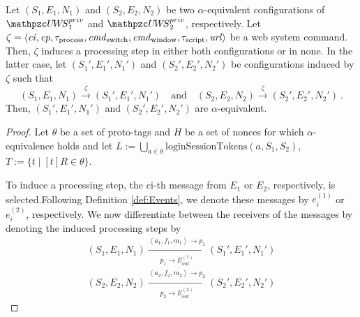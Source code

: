 \begin{theorem}
  \begin{lemma}\label{lemma:step-config-private}
    Let $(S_1,E_1,N_1)$ and $(S_2,E_2,N_2)$ be two 
    $\alpha$-equivalent configurations of 
    $\uppressoprivwebsystem_1$ and $\uppressoprivwebsystem_2$, 
    respectively. Let $\zeta = \langle\mathit{ci},\mathit{cp}, 
    \tau_\text{process}, \mathit{cmd}_\text{switch}, 
    \mathit{cmd}_\text{window},\tau_\text{script},\mathit{url}\rangle$
    be a web system command. Then, $\zeta$ induces a processing 
    step in either both configurations or in none. In the latter 
    case, let $(S_1',E_1',N_1')$ and $(S_2',E_2',N_2')$ be 
    configurations induced by $\zeta$ such that
    \[(S_1,E_1,N_1) \xrightarrow{\zeta} (S_1',E_1',N_1') \quad 
    \text{and} \quad (S_2,E_2,N_2) \xrightarrow{\zeta} 
    (S_2',E_2',N_2') \ .\]
    Then, $(S_1',E_1',N_1')$ and $(S_2',E_2',N_2')$ are
    $\alpha$-equivalent.  
  \end{lemma}
  \begin{proof}
    Let $\theta$ be a set of proto-tags and $H$ be a set of 
    nonces for which $\alpha$-equivalence holds and let 
    $L:=\bigcup_{a\in\theta}\text{loginSessionTokens}(a,S_1,S_2)$,
    $T:=\{t\mid [t]R\in \theta\}$.
    
    To induce a processing step, the ci-th message from $E_1$ or 
    $E_2$, respectively, is selected.Following Definition 
    \ref{def:Events}, we denote these messages by $e_i^{(1)}$ or 
    $e_i^{(2)}$, respectively. We now differentiate between the 
    receivers of the messages by denoting the induced processing 
    steps by
    \begin{equation}
      \begin{aligned}
        (S_1,E_1,N_1)\xrightarrow[p_1\rightarrow E_{out}^{(1)}]{\left \langle a_1,f_1,m_1\right \rangle\rightarrow p_1}(S_1\prime,E_1\prime,N_1\prime)\\
        (S_2,E_2,N_2)\xrightarrow[p_2\rightarrow E_{out}^{(2)}]{\left \langle a_2,f_2,m_2\right \rangle\rightarrow p_2}(S_2\prime,E_2\prime,N_2\prime)
      \end{aligned}
    \end{equation}

\end{proof}
\end{theorem}
